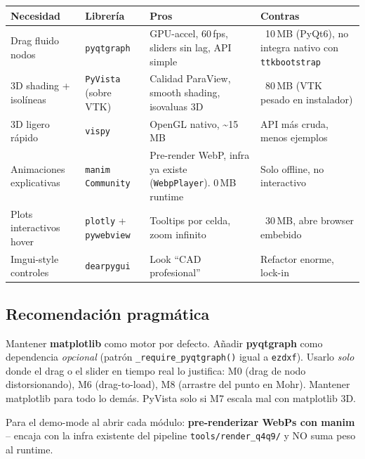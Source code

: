 \documentclass[11pt,a4paper]{article}
\begin{document}
\begin{center}
\renewcommand{\arraystretch}{1.3}
\begin{tabular}{@{}p{3.4cm} p{4.5cm} p{3.5cm} p{3.5cm}@{}}
\toprule
\textbf{Necesidad} & \textbf{Librería} & \textbf{Pros} & \textbf{Contras} \\
\midrule
Drag fluido nodos &
\texttt{pyqtgraph} &
GPU-accel, 60\,fps, sliders sin lag, API simple &
~10\,MB (PyQt6), no integra nativo con \texttt{ttkbootstrap} \\
\midrule
3D shading + isolíneas &
\texttt{PyVista} (sobre VTK) &
Calidad ParaView, smooth shading, isovaluas 3D &
~80\,MB (VTK pesado en instalador) \\
\midrule
3D ligero rápido &
\texttt{vispy} &
OpenGL nativo, \textasciitilde 15\,MB &
API más cruda, menos ejemplos \\
\midrule
Animaciones explicativas &
\texttt{manim Community} &
Pre-render WebP, infra ya existe (\texttt{WebpPlayer}). 0\,MB runtime &
Solo offline, no interactivo \\
\midrule
Plots interactivos hover &
\texttt{plotly} + \texttt{pywebview} &
Tooltips por celda, zoom infinito &
~30\,MB, abre browser embebido \\
\midrule
Imgui-style controles &
\texttt{dearpygui} &
Look ``CAD profesional'' &
Refactor enorme, lock-in \\
\bottomrule
\end{tabular}
\end{center}

\subsection{Recomendación pragmática}

\begin{ideaBox}
Mantener \textbf{matplotlib} como motor por defecto. Añadir
\textbf{pyqtgraph} como dependencia \emph{opcional} (patrón
\texttt{\_require\_pyqtgraph()} igual a \texttt{ezdxf}). Usarlo
\emph{solo} donde el drag o el slider en tiempo real lo justifica:
M0 (drag de nodo distorsionando), M6 (drag-to-load), M8 (arrastre del
punto en Mohr). Mantener matplotlib para todo lo demás. PyVista solo
si M7 escala mal con matplotlib 3D.

Para el demo-mode al abrir cada módulo: \textbf{pre-renderizar WebPs con
manim} -- encaja con la infra existente del pipeline
\texttt{tools/render\_q4q9/} y NO suma peso al runtime.
\end{ideaBox}
\end{document}
